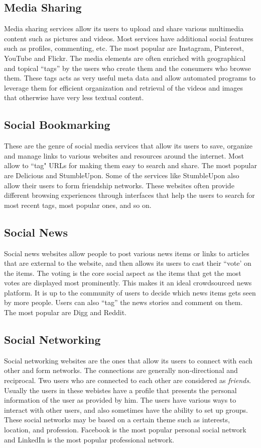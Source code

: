 \subsection{Media Sharing}
Media sharing services allow its users to upload and share various multimedia content such as pictures and videos. Most services have additional social features such as profiles, commenting, etc. The most popular are Instagram, Pinterest, YouTube and Flickr. The media elements are often enriched with geographical and topical ``tags'' by the users who create them and the consumers who browse them. These tags acts as very useful meta data and allow automated programs to leverage them for efficient organization and retrieval of the videos and images that otherwise have very less textual content. 

\subsection{Social Bookmarking}
These are the genre of social media services that allow its users to save, organize and manage links to various websites and resources around the internet. Most allow to ``tag" URLs for making them easy to search and share. The most popular are Delicious and StumbleUpon. Some of the services like StumbleUpon also allow their users to form friendship networks. These websites often provide different browsing experiences through interfaces that help the users to search for most recent tags, most popular ones, and so on.

\subsection{Social News}
Social news websites allow people to post various news items or links to articles that are external to the website, and then allows its users to cast their ``vote' on the items. The voting is the core social aspect as the items that get the most votes are displayed most prominently. This makes it an ideal crowdsourced news platform. It is up to the community of users to decide which news items gets seen by more people. Users can also ``tag'' the news stories and comment on them. The most popular are Digg and Reddit.

\subsection{Social Networking}
Social networking websites are the ones that allow its users to connect with each other and form networks. The connections are generally non-directional and reciprocal. Two users who are connected to each other are considered as \textit{friends}. Usually the users in these webistes have a profile that presents the personal information of the user as provided by him. The users have various ways to interact with other users, and also sometimes have the ability to set up groups. These social networks may be based on a certain theme such as interests, location, and profession. Facebook is the most popular personal social network and LinkedIn is the most popular professional network.


